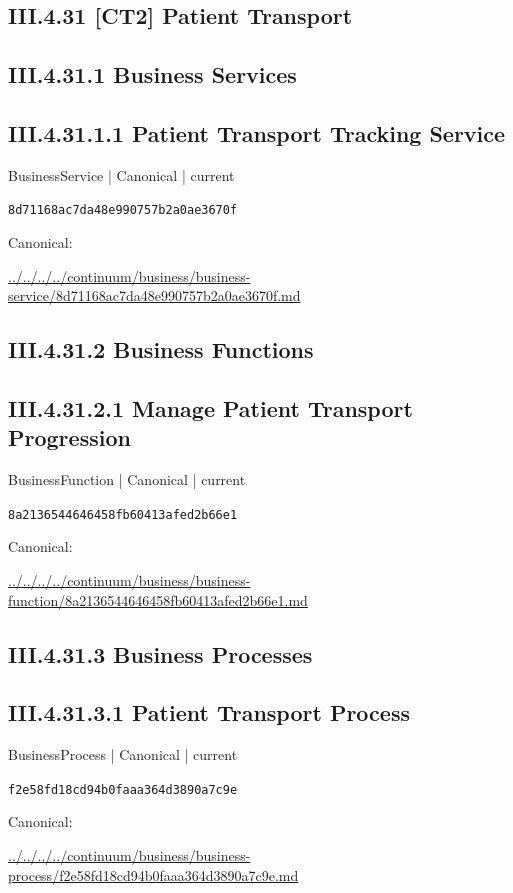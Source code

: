 \documentclass[10pt,a4paper]{article}
\begin{document}
\subsection*{III.4.31 [CT2] Patient Transport}
\subsection*{III.4.31.1 Business Services}
\subsection*{III.4.31.1.1 Patient Transport Tracking Service}
{\small BusinessService | Canonical | current}\par
\texttt{8d71168ac7da48e990757b2a0ae3670f}\par
Canonical: \par
{\footnotesize\url{../../../../continuum/business/business-service/8d71168ac7da48e990757b2a0ae3670f.md}}\par
\subsection*{III.4.31.2 Business Functions}
\subsection*{III.4.31.2.1 Manage Patient Transport Progression}
{\small BusinessFunction | Canonical | current}\par
\texttt{8a2136544646458fb60413afed2b66e1}\par
Canonical: \par
{\footnotesize\url{../../../../continuum/business/business-function/8a2136544646458fb60413afed2b66e1.md}}\par
\subsection*{III.4.31.3 Business Processes}
\subsection*{III.4.31.3.1 Patient Transport Process}
{\small BusinessProcess | Canonical | current}\par
\texttt{f2e58fd18cd94b0faaa364d3890a7c9e}\par
Canonical: \par
{\footnotesize\url{../../../../continuum/business/business-process/f2e58fd18cd94b0faaa364d3890a7c9e.md}}\par
\end{document}
